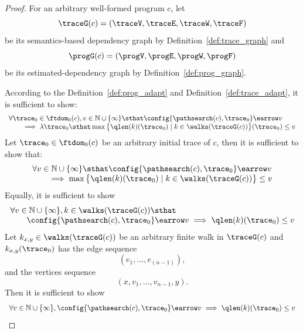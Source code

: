 \begin{proof}
  For an arbitrary well-formed program ${c}$, let 
  $$\traceG({c}) = (\traceV, \traceE, \traceW, \traceF)$$
  be its semantics-based dependency graph by Definition~\ref{def:trace_graph} and 
  \[
    \progG({c}) = (\progV, \progE, \progW, \progF)
    \]
   be its estimated-dependency graph
  by Definition~\ref{def:prog_graph}.
  
  According to the Definition~\ref{def:prog_adapt} and Definition~\ref{def:trace_adapt}, it is sufficient to show:
  \[
    \begin{array}{l}
      \forall \trace_0 \in \ftdom_{0}(c), v \in \mathbb{N} \cup \{\infty\} \sthat
      \config{\pathsearch(c), \trace_0} \earrow v
    \\ \qquad 
    \implies
      \lambda \trace_0 \sthat \max \big 
      \{ \qlen(k)(\trace_0) \mid k \in \walks(\traceG(c)) \big \} (\trace_0) 
      \leq v
  \end{array}
  \]
  Let $\trace_0 \in \ftdom_0(c)$ be an arbitrary initial trace of $c$,
  then it is sufficient to show that:
  \[
    \begin{array}{l}
      \forall v \in \mathbb{N} \cup \{\infty\} \sthat
      \config{\pathsearch(c), \trace_0} \earrow v 
    \\ \qquad 
    \implies
    \max \big 
      \{ \qlen(k)(\trace_0) \mid k \in \walks(\traceG(c)) \big \}
      \leq v
  \end{array}
  \]
  Equally, it is sufficient to show
  \[
    \begin{array}{l}
      \forall v \in \mathbb{N} \cup \{\infty\},
      k \in \walks(\traceG(c))  \sthat
      \\ \qquad 
    \config{\pathsearch(c), \trace_0} \earrow v 
    \implies
    \qlen(k)(\trace_0) \leq v
  \end{array}
    \]
  Let $k_{x, y} \in \walks(\traceG(c))$ be an arbitrary finite walk in $\traceG(c)$ and 
  $k_{x,y}(\trace_0)$  has the edge sequence
  \[
    (e_{1}, \ldots, e_{(n-1)}),
    \]
    and the vertices sequence
  \[
    (x, v_1, \ldots, v_{n-1}, y).
    \]
  Then it is sufficient to show
  \[
    \begin{array}{l}
      \forall v \in \mathbb{N} \cup \{\infty\},
    \config{\pathsearch(c), \trace_0} \earrow v 
    \implies
    \qlen(k)(\trace_0) \leq v
  \end{array}
    \]


\end{proof}
